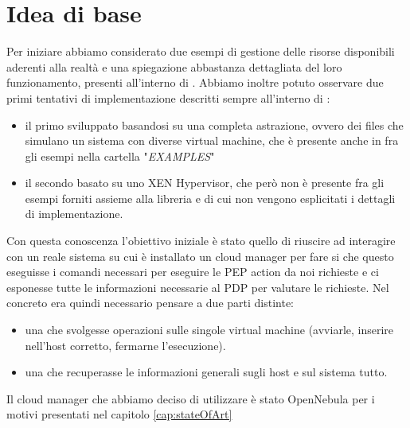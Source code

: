 \section{Idea di base}
Per iniziare abbiamo considerato due esempi di gestione delle risorse disponibili aderenti alla realtà e una spiegazione abbastanza dettagliata del loro funzionamento, presenti all'interno di \cite{10.1007/978-3-319-08260-8_6}.
Abbiamo inoltre potuto osservare due primi tentativi di implementazione descritti sempre all'interno di \cite{10.1007/978-3-319-08260-8_6}:
\begin{itemize} 
    \item il primo sviluppato basandosi su una completa astrazione, ovvero dei files che simulano un sistema con diverse virtual machine, che è presente anche in \cite{facpl-github} fra gli esempi nella cartella "\emph{EXAMPLES}"
    \item il secondo basato su uno XEN Hypervisor, che però non è presente fra gli esempi forniti assieme alla libreria e di cui non vengono esplicitati i dettagli di implementazione.
\end{itemize}
Con questa conoscenza l'obiettivo iniziale è stato quello di riuscire ad interagire con un reale sistema su cui è installato un cloud manager per fare si che questo eseguisse i comandi necessari per eseguire le PEP action da noi richieste e ci esponesse tutte le informazioni necessarie al PDP per valutare le richieste.
Nel concreto era quindi necessario pensare a due parti distinte:
\begin{itemize}
    \item una che svolgesse operazioni sulle singole virtual machine (avviarle, inserire nell'host corretto, fermarne l'esecuzione).
    \item una che recuperasse le informazioni generali sugli host e sul sistema tutto.
\end{itemize}
Il cloud manager che abbiamo deciso di utilizzare è stato OpenNebula per i motivi presentati nel capitolo \ref{cap:stateOfArt}


